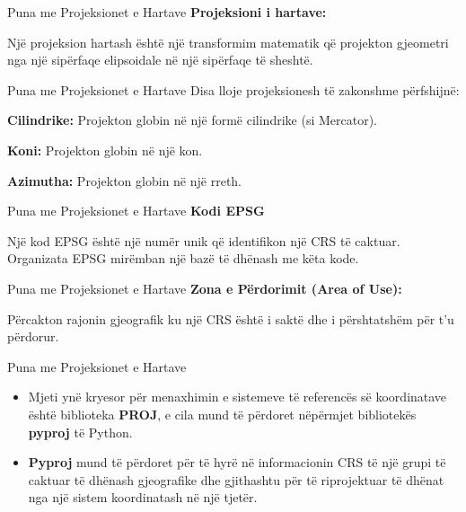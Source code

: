 \documentclass[
  ignorenonframetext,
]{beamer}
\begin{document}
\begin{frame}{Puna me Projeksionet e Hartave}
\protect\hypertarget{puna-me-projeksionet-e-hartave-6}{}
\textbf{Projeksioni i hartave:}

Një projeksion hartash është një transformim matematik që projekton
gjeometri nga një sipërfaqe elipsoidale në një sipërfaqe të sheshtë.
\end{frame}

\begin{frame}{Puna me Projeksionet e Hartave}
\protect\hypertarget{puna-me-projeksionet-e-hartave-7}{}
Disa lloje projeksionesh të zakonshme përfshijnë:

\textbf{Cilindrike:} Projekton globin në një formë cilindrike (si
Mercator).

\textbf{Koni:} Projekton globin në një kon.

\textbf{Azimutha:} Projekton globin në një rreth.
\end{frame}

\begin{frame}{Puna me Projeksionet e Hartave}
\protect\hypertarget{puna-me-projeksionet-e-hartave-8}{}
\textbf{Kodi EPSG}

Një kod EPSG është një numër unik që identifikon një CRS të caktuar.
Organizata EPSG mirëmban një bazë të dhënash me këta kode.
\end{frame}

\begin{frame}{Puna me Projeksionet e Hartave}
\protect\hypertarget{puna-me-projeksionet-e-hartave-9}{}
\textbf{Zona e Përdorimit (Area of Use):}

Përcakton rajonin gjeografik ku një CRS është i saktë dhe i përshtatshëm
për t'u përdorur.
\end{frame}

\begin{frame}{Puna me Projeksionet e Hartave}
\protect\hypertarget{puna-me-projeksionet-e-hartave-10}{}
\begin{itemize}
\item
  Mjeti ynë kryesor për menaxhimin e sistemeve të referencës së
  koordinatave është biblioteka \textbf{PROJ}, e cila mund të përdoret
  nëpërmjet bibliotekës \textbf{pyproj} të Python.
\item
  \textbf{Pyproj} mund të përdoret për të hyrë në informacionin CRS të
  një grupi të caktuar të dhënash gjeografike dhe gjithashtu për të
  riprojektuar të dhënat nga një sistem koordinatash në një tjetër.
\end{itemize}
\end{frame}
\end{document}
